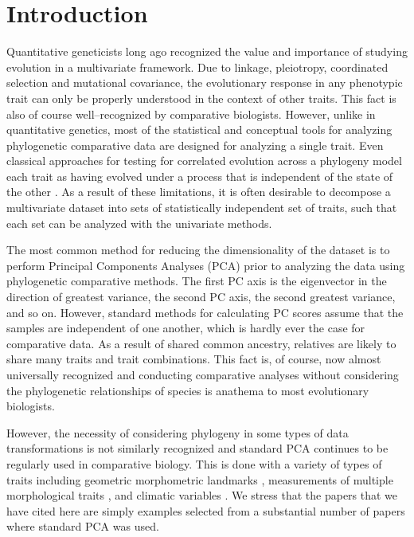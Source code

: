 \documentclass[a4paper,12pt]{article}
\begin{document}
\newpage

\section{Introduction}
Quantitative geneticists long ago recognized the value and importance of studying evolution in a multivariate framework. Due to linkage, pleiotropy, coordinated selection and mutational covariance, the evolutionary response in any phenotypic trait can only be properly understood in the context of other traits. This fact is also of course well--recognized by comparative biologists. However, unlike in quantitative genetics, most of the statistical and conceptual tools for analyzing phylogenetic comparative data \citep[recently reviewed in][]{PennellHarmon} are designed for analyzing a single trait. Even classical approaches for testing for correlated evolution across a phylogeny \citep[e.g.,][]{Felsenstein1985, Grafen1989, HarveyPagel1991} model each trait as having evolved under a process that is independent of the state of the other \citep{HansenOrzack2005}. As a result of these limitations, it is often desirable to decompose a multivariate dataset into sets of statistically independent set of traits, such that each set can be analyzed with the univariate methods.

The most common method for reducing the dimensionality of the dataset is to perform Principal Components Analyses (PCA) prior to analyzing the data using phylogenetic comparative methods. The first PC axis is the eigenvector in the direction of greatest variance, the second PC axis, the second greatest variance, and so on. However, standard methods for calculating PC scores assume that the samples are independent of one another, which is hardly ever the case for comparative data. As a result of shared common ancestry, relatives are likely to share many traits and trait combinations. This fact is, of course, now almost universally recognized and conducting comparative analyses without considering the phylogenetic relationships of species is anathema to most evolutionary biologists.

However, the necessity of considering phylogeny in some types of data transformations \citep{Revell2008} is not similarly recognized and standard PCA continues to be regularly used in comparative biology. This is done with a variety of types of traits including geometric morphometric landmarks \citep[e.g.,][]{Dornburg2011, Hunt2013}, measurements of multiple morphological traits \citep[e.g.,][]{Harmon2010, BergmannIrshick2012, Weir2012, Pienaar2013, Price2014}, and climatic variables \citep[e.g.,][]{KozakWiens2010, Schnitzler2012}. We stress that the papers that we have cited here are simply examples selected from a substantial number of papers where standard PCA was used.
\end{document}
